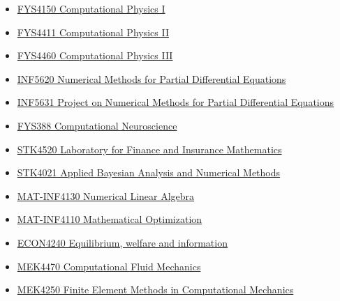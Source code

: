 \documentclass[%
twoside,                 %
final,                   %
10pt]{article}
\begin{document}
\begin{itemize}
\item \href{{http://www.uio.no/studier/emner/matnat/fys/FYS4150/index-eng.html}}{FYS4150 Computational Physics I}

\item \href{{http://www.uio.no/studier/emner/matnat/fys/FYS4411/}}{FYS4411 Computational Physics II}

\item \href{{http://www.uio.no/studier/emner/matnat/fys/FYS4460/}}{FYS4460 Computational Physics III}

\item \href{{http://www.uio.no/studier/emner/matnat/ifi/INF5620/index-eng.html}}{INF5620 Numerical Methods for Partial Differential Equations}

\item \href{{http://www.uio.no/studier/emner/matnat/ifi/INF5631/index-eng.html}}{INF5631 Project on Numerical Methods for Partial Differential Equations}

\item \href{{http://www.nmbu.no/course/FYS388}}{FYS388 Computational Neuroscience}

\item \href{{http://www.uio.no/studier/emner/matnat/math/STK4520/index-eng.html}}{STK4520 Laboratory for Finance and Insurance Mathematics}

\item \href{{http://www.uio.no/studier/emner/matnat/math/STK4021/index-eng.html}}{STK4021 Applied Bayesian Analysis and Numerical Methods}

\item \href{{http://www.uio.no/studier/emner/matnat/math/MAT-INF4130/index-eng.html}}{MAT-INF4130  Numerical Linear Algebra}

\item \href{{http://www.uio.no/studier/emner/matnat/math/MAT-INF4110/index.html}}{MAT-INF4110 Mathematical Optimization}

\item \href{{http://www.uio.no/studier/emner/sv/oekonomi/ECON4240/index.html}}{ECON4240 Equilibrium, welfare and information}

\item \href{{http://www.uio.no/studier/emner/matnat/math/MEK4470/index-eng.html}}{MEK4470  Computational Fluid Mechanics}

\item \href{{http://www.uio.no/studier/emner/matnat/math/MEK4250/index-eng.html}}{MEK4250 Finite Element Methods in Computational Mechanics}
\end{itemize}
\end{document}
